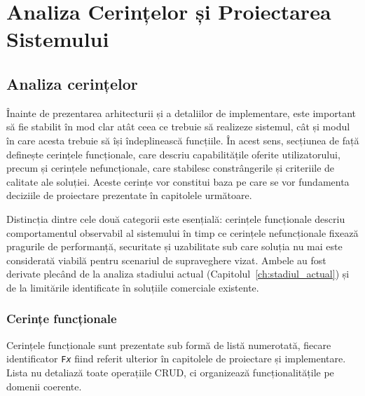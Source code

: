 \documentclass[../../main.tex]{subfiles}
\begin{document}
\chapter{Analiza Cerințelor și Proiectarea \\ Sistemului}
\label{ch:analiza_proiectare}

\section{Analiza cerințelor}
\label{sec:analiza_cerinte}

Înainte de prezentarea arhitecturii și a detaliilor de implementare, este important să fie stabilit în mod clar atât ceea ce trebuie să realizeze sistemul, cât și modul în care acesta trebuie să își îndeplinească funcțiile. În acest sens, secțiunea de față definește cerințele funcționale, care descriu capabilitățile oferite utilizatorului, precum și cerințele nefuncționale, care stabilesc constrângerile și criteriile de calitate ale soluției. Aceste cerințe vor constitui baza pe care se vor fundamenta deciziile de proiectare prezentate în capitolele următoare.

Distincția dintre cele două categorii este esențială: cerințele funcționale descriu comportamentul observabil al sistemului în timp ce cerințele nefuncționale fixează pragurile de performanță, securitate și uzabilitate sub care soluția nu mai este considerată viabilă pentru scenariul de supraveghere vizat. Ambele au fost derivate plecând de la analiza stadiului actual (Capitolul~\ref{ch:stadiul_actual}) și de la limitările identificate în soluțiile comerciale existente.

\subsection{Cerințe funcționale}
\label{subsec:cerinte_functionale}

Cerințele funcționale sunt prezentate sub formă de listă numerotată, fiecare identificator \texttt{F\textit{x}} fiind referit ulterior în capitolele de proiectare și implementare. Lista nu detaliază toate operațiile CRUD, ci organizează funcționalitățile pe domenii coerente.
\end{document}
